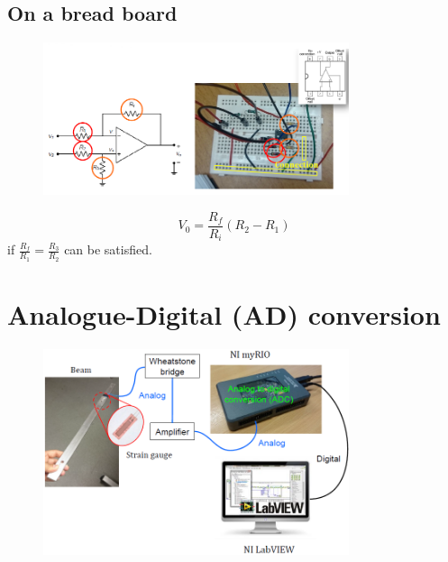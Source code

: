 \documentclass[class=report, crop=false, 12pt,a4paper]{standalone}
\begin{document}
\subsection{On a bread board}
\begin{figure}[H]
  \centering
  \includegraphics[width = 0.8\textwidth]{../img/diagram53.png}
\end{figure}
\begin{equation}
  V_0 = \frac{R_f}{R_i}(R_2 - R_1)
\end{equation}
if $\frac{R_f}{R_1} = \frac{R_3}{R_2}$ can be satisfied.
\section{Analogue-Digital (AD) conversion}
\begin{figure}[H]
  \centering
  \includegraphics[width = 0.8\textwidth]{../img/diagram54.png}
\end{figure}
\end{document}
